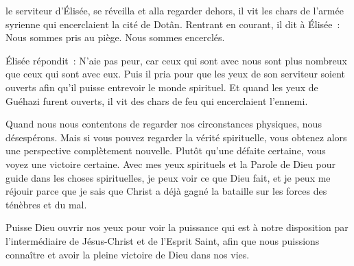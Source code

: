 


 le serviteur d'Élisée, se réveilla
 et alla regarder dehors, il vit les chars de l'armée syrienne
 qui encerclaient la cité de Dotân.
 Rentrant en courant, il dit à Élisée~:
 \og Nous sommes pris au piège. Nous sommes encerclés. \fg{}

Élisée répondit~:
 \og N'aie pas peur, car ceux qui sont avec nous sont plus nombreux
 que ceux qui sont avec eux. \fg{}
 Puis il pria pour que les yeux de son serviteur soient ouverts
 afin qu'il puisse entrevoir le monde spirituel.
 Et quand les yeux de Guéhazi furent ouverts,
 il vit des chars de feu qui encerclaient l'ennemi. 


Quand nous nous contentons de regarder nos circonstances physiques,
 nous désespérons. Mais si vous pouvez regarder la vérité spirituelle,
 vous obtenez alors une perspective complètement nouvelle.
 Plutôt qu'une défaite certaine, vous voyez une victoire certaine.
 Avec mes yeux spirituels et la Parole de Dieu pour guide
 dans les choses spirituelles, je peux voir ce que Dieu fait,
 et je peux me réjouir parce que je sais que Christ a déjà gagné
 la bataille sur les forces des ténèbres et du mal. 

Puisse Dieu ouvrir nos yeux pour voir la puissance qui est à notre
 disposition par l'intermédiaire de Jésus-Christ et de l'Esprit Saint, 
 afin que nous puissions connaître et avoir la pleine victoire de Dieu
 dans nos vies. 

\dvrule






